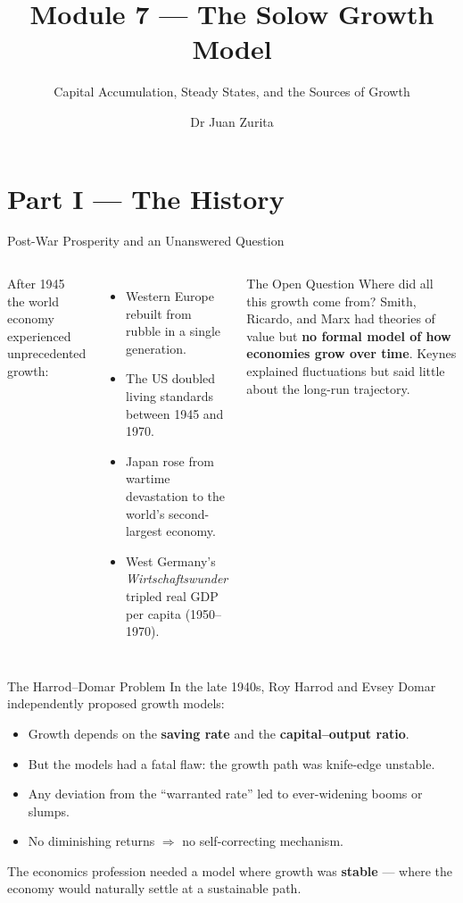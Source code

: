 \documentclass[aspectratio=169, 10pt]{beamer}
\title{Module 7 --- The Solow Growth Model}
\subtitle{Capital Accumulation, Steady States, and the Sources of Growth}
\author{Dr Juan Zurita}
\institute{From Smith to Simulation\\
The University of Edinburgh~$\cdot$~School of Economics}
\date{}
\begin{document}
\maketitle

\section{Part I --- The History}

\begin{frame}{Post-War Prosperity and an Unanswered Question}
\begin{columns}[T]
After 1945 the world economy experienced unprecedented growth:
\begin{itemize}
  \item Western Europe rebuilt from rubble in a single generation.
  \item The US doubled living standards between 1945 and 1970.
  \item Japan rose from wartime devastation to the world's second-largest economy.
  \item West Germany's \textit{Wirtschaftswunder} tripled real GDP per capita
        (1950--1970).
\end{itemize}
\begin{block}{The Open Question}
Where did all this growth come from?
Smith, Ricardo, and Marx had theories of value but
\textbf{no formal model of how economies grow over time}.
Keynes explained fluctuations but said little about the
\alert{long-run trajectory}.
\end{block}
\end{columns}
\end{frame}

\begin{frame}{The Harrod--Domar Problem}
In the late 1940s, Roy Harrod and Evsey Domar independently proposed
growth models:
\vspace{0.5em}
\begin{itemize}
  \item Growth depends on the \textbf{saving rate} and the
        \textbf{capital--output ratio}.
  \item But the models had a fatal flaw: the growth path was
        \alert{knife-edge unstable}.
  \item Any deviation from the ``warranted rate'' led to ever-widening
        booms or slumps.
  \item No diminishing returns $\Rightarrow$ no self-correcting mechanism.
\end{itemize}
\vspace{0.5em}
The economics profession needed a model where growth was
\textbf{stable} --- where the economy would naturally settle
at a sustainable path.
\end{frame}
\end{document}
